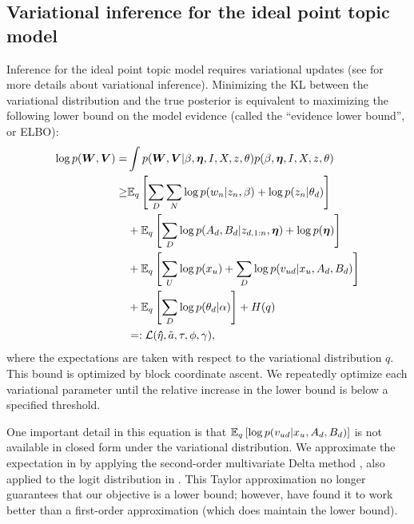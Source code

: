 \newcommand{\Ell}{\mathcal{L}}

\subsection*{Variational inference for the ideal point topic model}
\label{sec:iptm_app_variational_inference}

Inference for the ideal point topic model requires variational updates
(see \cite{jordan:1999} for more details about variational inference).
Minimizing the KL between the variational distribution and the true
posterior is equivalent to maximizing the following lower bound on the
model evidence (called the ``evidence lower bound'', or ELBO):
\begin{align}
\log p(\bm W, \bm V) = &
\int p(\bm W, \bm V | \beta, \bm \eta, I, X, z, \theta) p(\beta, \bm \eta, I, X, z, \theta) \nonumber \\
 \geq & \expectq{\sum_D \sum_N \log p(w_n | z_n, \beta)
   + \log p(z_n | \theta_d)} \nonumber \\
& + \expectq{ \sum_D \log p(A_d, B_d | z_{d, 1:n}, \bm \eta) + \log p(\bm \eta) }\nonumber \\
& + \expectq{ \sum_U \log p(x_u) + \sum_D \log p(v_{ud} | x_u, A_d, B_d) } \nonumber \\
& + \expectq{ \sum_D \log p(\theta_d | \alpha) } + H(q) \nonumber \\
& =: \Ell(\ev, {\tilde a}, \tau, \phi, \gamma),  \label{eq:elbo}
\end{align}
where the expectations are taken with respect to the variational
distribution $q$. This bound is optimized by block coordinate ascent.
We repeatedly optimize each variational parameter until the relative
increase in the lower bound is below a specified threshold.


One important detail in this equation is that $\mathbb{E}_q\left[\log p(v_{ud}
  | x_u, A_d, B_d)\right]$ is not available in closed form under the variational
distribution.  We approximate the expectation in  by
applying the second-order multivariate Delta method
\cite{bickel:2007}, also applied to the logit distribution in
\cite{chang:2009,braun:2007}.  This Taylor approximation no longer
guarantees that our objective is a lower bound; however,
\cite{braun:2007} have found it to work better than a first-order
approximation (which does maintain the lower bound).


